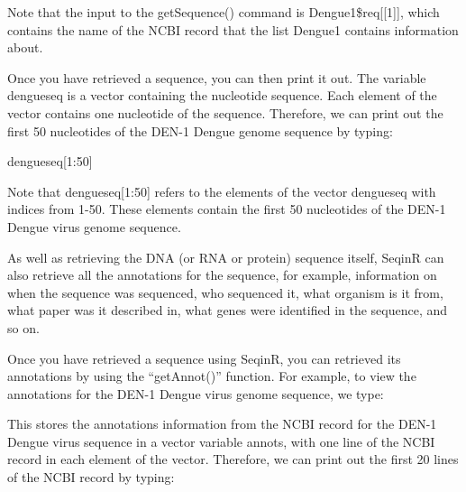 \documentclass[
]{book}
\newenvironment{Shaded}{\begin{snugshade}}{\end{snugshade}}
\newcommand{\DecValTok}[1]{\textcolor[rgb]{0.00,0.00,0.81}{#1}}
\newcommand{\DocumentationTok}[1]{\textcolor[rgb]{0.56,0.35,0.01}{\textbf{\textit{#1}}}}
\newcommand{\FunctionTok}[1]{\textcolor[rgb]{0.00,0.00,0.00}{#1}}
\newcommand{\NormalTok}[1]{#1}
\newcommand{\OtherTok}[1]{\textcolor[rgb]{0.56,0.35,0.01}{#1}}
\newcommand{\SpecialCharTok}[1]{\textcolor[rgb]{0.00,0.00,0.00}{#1}}
\begin{document}
\begin{Shaded}
\end{Shaded}

Note that the input to the getSequence() command is Dengue1\$req{[}{[}1{]}{]}, which contains the name of the NCBI record that the list Dengue1 contains information about.

Once you have retrieved a sequence, you can then print it out. The variable dengueseq is a vector containing the nucleotide sequence. Each element of the vector contains one nucleotide of the sequence. Therefore, we can print out the first 50 nucleotides of the DEN-1 Dengue genome sequence by typing:

\begin{Shaded}
\begin{Highlighting}[]
\NormalTok{dengueseq[}\DecValTok{1}\SpecialCharTok{:}\DecValTok{50}\NormalTok{]}
\end{Highlighting}
\end{Shaded}

Note that dengueseq{[}1:50{]} refers to the elements of the vector dengueseq with indices from 1-50. These elements contain the first 50 nucleotides of the DEN-1 Dengue virus genome sequence.

As well as retrieving the DNA (or RNA or protein) sequence itself, SeqinR can also retrieve all the annotations for the sequence, for example, information on when the sequence was sequenced, who sequenced it, what organism is it from, what paper was it described in, what genes were identified in the sequence, and so on.

Once you have retrieved a sequence using SeqinR, you can retrieved its annotations by using the ``getAnnot()'' function. For example, to view the annotations for the DEN-1 Dengue virus genome sequence, we type:

\begin{Shaded}
\end{Shaded}

This stores the annotations information from the NCBI record for the DEN-1 Dengue virus sequence in a vector variable annots, with one line of the NCBI record in each element of the vector. Therefore, we can print out the first 20 lines of the NCBI record by typing:
\end{document}
